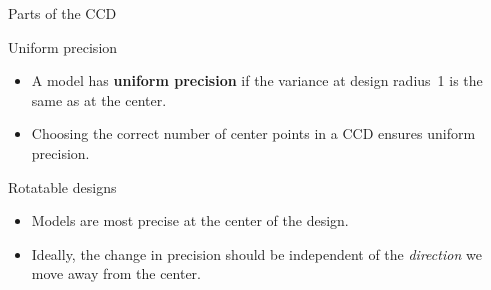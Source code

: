 \documentclass[10pt]{beamer}
\begin{document}
{\begin{frame}{Parts of the CCD}
\begin{itemize}[<+->]
\end{itemize}
\end{frame}

\begin{frame}{Uniform precision}

\begin{itemize}
	\item A model has \textbf{uniform precision} if the variance at design radius~1 is the same as at the center.
\end{itemize}


\begin{itemize}
	\item<3-> Choosing the correct number of center points in a CCD ensures uniform precision.
\end{itemize}
	
\end{frame}


\begin{frame}{Rotatable designs}

\begin{itemize}
	\item Models are most precise at the center of the design.
	\item<2-> Ideally, the change in precision should be independent of the \emph{direction} we move away from the center.
\end{itemize}




\end{frame}}
\end{document}
